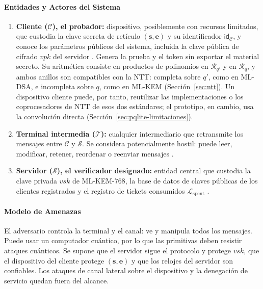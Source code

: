 \paragraph{Entidades y Actores del Sistema}

\begin{enumerate}
    \item \textbf{Cliente ($\mathcal{C}$), el probador:} dispositivo, posiblemente con recursos limitados, que custodia la clave secreta de retículo $(\mathbf{s}, \mathbf{e})$ y su identificador $\mathsf{id}_{\mathcal{C}}$, y conoce los parámetros públicos del sistema, incluida la clave pública de cifrado $vpk$ del servidor \cite{mukil2026implementing, ma2026laasso}. Genera la prueba y el token sin exportar el material secreto. Su aritmética consiste en productos de polinomios en $\mathcal{R}_{q'}$ y en $\mathcal{R}_q$, y ambos anillos son compatibles con la NTT: completa sobre $q'$, como en ML-DSA, e incompleta sobre $q$, como en ML-KEM (Sección~\ref{sec:ntt}). Un dispositivo cliente puede, por tanto, reutilizar las implementaciones o los coprocesadores de NTT de esos dos estándares; el prototipo, en cambio, usa la convolución directa (Sección~\ref{sec:pqlite-limitaciones}).
    \item \textbf{Terminal intermedia ($\mathcal{T}$):} cualquier intermediario que retransmite los mensajes entre $\mathcal{C}$ y $\mathcal{S}$. Se considera potencialmente hostil: puede leer, modificar, retener, reordenar o reenviar mensajes \cite{ma2026laasso}.
    \item \textbf{Servidor ($\mathcal{S}$), el verificador designado:} entidad central que custodia la clave privada $vsk$ de ML-KEM-768, la base de datos de claves públicas de los clientes registrados y el registro de tickets consumidos $\mathcal{L}_{\text{spent}}$ \cite{yang2025multiserver, ma2026laasso}.
\end{enumerate}

\paragraph{Modelo de Amenazas}

El adversario controla la terminal y el canal: ve y manipula todos los mensajes. Puede usar un computador cuántico, por lo que las primitivas deben resistir ataques cuánticos. Se supone que el servidor sigue el protocolo y protege $vsk$, que el dispositivo del cliente protege $(\mathbf{s}, \mathbf{e})$ y que los relojes del servidor son confiables. Los ataques de canal lateral sobre el dispositivo y la denegación de servicio quedan fuera del alcance.

